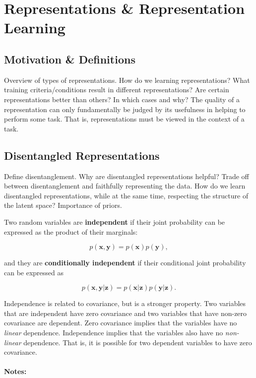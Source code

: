 \chapter{Representations \& Representation Learning}

\section{Motivation \& Definitions}

Overview of types of representations. How do we learning representations? What training criteria/conditions result in different representations? Are certain representations better than others? In which cases and why? The quality of a representation can only fundamentally be judged by its usefulness in helping to perform some task. That is, representations must be viewed in the context of a task.



\section{Disentangled Representations}

Define disentanglement. Why are disentangled representations helpful? Trade off between disentanglement and faithfully representing the data. How do we learn disentangled representations, while at the same time, respecting the structure of the latent space? Importance of priors.

Two random variables are \textbf{independent} if their joint probability can be expressed as the product of their marginals:

\begin{equation}
	p(\mathbf{x}, \mathbf{y}) = p(\mathbf{x}) p(\mathbf{y}),
\end{equation}

\noindent and they are \textbf{conditionally independent} if their conditional joint probability can be expressed as

\begin{equation}
	p(\mathbf{x}, \mathbf{y} | \mathbf{z}) = p(\mathbf{x} | \mathbf{z}) p(\mathbf{y} | \mathbf{z}).
\end{equation}

Independence is related to covariance, but is a stronger property. Two variables that are independent have zero covariance and two variables that have non-zero covariance are dependent. Zero covariance implies that the variables have no \textit{linear} dependence. Independence implies that the variables also have no \textit{non-linear} dependence. That is, it is possible for two dependent variables to have zero covariance. 
\\
\\
\noindent \textbf{Notes:}

